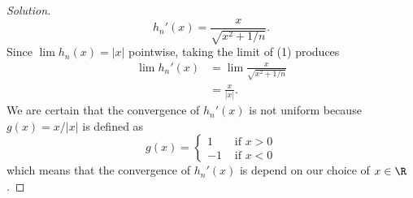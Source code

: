 \begin{enumerate}
\begin{proof}[Solution]
        \[  h_n'(x) = \frac{ x }{ \sqrt{ x^2 + 1/n }  }. \tag{1}  \]
        Since \( \lim h_n(x) = | x |   \) pointwise, taking the limit of (1) produces
        \begin{align*}
           \lim h_n'(x) &= \lim \frac{ x }{ \sqrt{ x^2 + 1/n }  }  \\
                        &= \frac{ x }{ | x |  }.
        \end{align*}
        We are certain that the convergence of \( h_n'(x)  \) is not uniform because \( g(x) = x / | x  |  \) is defined as 
        \[  g(x) = 
        \begin{cases}
            1 &\text{ if } x > 0 \\
            -1 &\text{ if } x < 0 
        \end{cases} \]
        which means that the convergence of \( h_n'(x)  \) is depend on our choice of \( x \in \R   \).
        \end{proof}
\end{enumerate}

